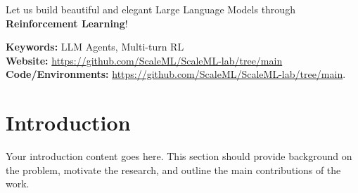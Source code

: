 \documentclass[11pt,letterpaper]{article}
\begin{document}
\vspace{0.2in}

\begin{tcolorbox}[
    colback=abscol,
    colframe=abscol,
    boxrule=0.5pt,
    arc=3pt,
    left=10pt,
    right=10pt,
    top=10pt,
    bottom=10pt
]
Let us build beautiful and elegant Large Language Models through \textbf{Reinforcement Learning}!

\textbf{Keywords:} LLM Agents, Multi-turn RL\\
\textbf{Website:} \url{https://github.com/ScaleML/ScaleML-lab/tree/main}\\
\textbf{Code/Environments:} \url{https://github.com/ScaleML/ScaleML-lab/tree/main}.
\end{tcolorbox}

\section{Introduction}

Your introduction content goes here. This section should provide background on the problem, motivate the research, and outline the main contributions of the work.



\end{document}
